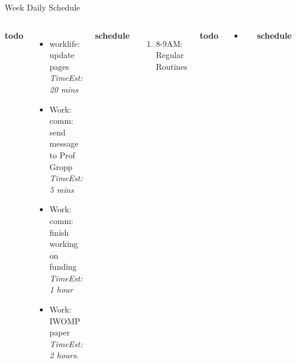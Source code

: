 \documentclass[serif, mathserif, final]{beamer}
\newcommand{\te}[1]{\textit{TimeEst:} \textit{#1}}
\newcommand{\dl}[1]{#1}
\begin{document}
\begin{frame}{}
\begin{columns}
\begin{column}{0.50\linewidth}
\begin{block}{Week Daily Schedule}
\begin{columns}
  \textbf{\small todo} \\
  \begin{itemize} 
  \tiny \item \tiny worklife: update pages \te{20 mins} 
    \item \tiny Work: comm: send message to Prof Gropp \te{5 mins} 
      \tiny \item \tiny Work: comm: finish working on funding \te{1 hour} 
    \item \tiny Work: IWOMP paper  \te {2 hours}. 
  \end{itemize}  
  \textbf{\small schedule}\\ 
  \begin{enumerate} 
    \tiny \item \tiny 8-9AM: Regular Routines 
  \end{enumerate} 

  \textbf{\small todo} \\
  \begin{itemize}
\tiny \item \tiny 

  \end{itemize}
  \textbf{\small schedule} \\
  \begin{enumerate}
    \tiny \item \tiny 8-9AM: Regular Routines 
  \end{enumerate}
  
  \textbf{\small todo}\\
  \begin{itemize} 
    \tiny \item \tiny Work: finish slides  = Work: finish  slides +
    Work: finish meeting prep\te{3 hours} 

  \item \tiny Work: comm: send message to Jonathan Freund  = Work:
    talk to dad + Work: figure out what to say to Prof gropp +
    Work:comm: send message to Jon Freund  \te{3 hours}
  \item \tiny Work: comm: send out resume = Work:comm: send out resume
  to dropbox + ...  \te{1 hour}  

  \item \tiny Work: comm: send thanks to Christian Terboven. \te{1
    hour} \dl{} 

  \item \tiny Comm: send message to Atul about the photos \te{20 mins}
    \dl{Before9PM} 


\end{itemize}
\end{columns}
\end{block}
\end{column}
\end{columns}
\end{frame}
\end{document}
